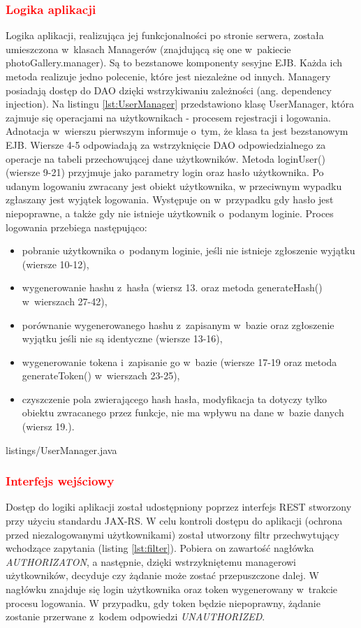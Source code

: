 \subsubsection{\textcolor{red}{Logika aplikacji}}
Logika aplikacji, realizująca jej funkcjonalności po stronie serwera, została umieszczona w~klasach Managerów (znajdującą się one w~pakiecie photoGallery.manager). Są to bezstanowe komponenty sesyjne EJB. Każda ich metoda realizuje jedno polecenie, które jest niezależne od innych. Managery posiadają dostęp do DAO dzięki wstrzykiwaniu zależności (ang. dependency injection). Na listingu
\ref{lst:UserManager} przedstawiono klasę UserManager, która zajmuje się
operacjami na użytkownikach - procesem rejestracji i logowania. Adnotacja w~wierszu pierwszym informuje o~tym, że klasa ta
jest bezstanowym EJB. Wiersze 4-5 odpowiadają za wstrzyknięcie DAO
odpowiedzialnego za operacje na tabeli przechowującej dane użytkowników.
Metoda loginUser() (wiersze 9-21) przyjmuje jako parametry login oraz
hasło użytkownika. Po udanym logowaniu zwracany jest obiekt użytkownika, w
przeciwnym wypadku zgłaszany jest wyjątek logowania. Występuje on w~przypadku
gdy hasło jest niepoprawne, a także gdy nie istnieje użytkownik o~podanym loginie. Proces logowania przebiega następująco:
\begin{itemize}
	\item pobranie użytkownika o~podanym loginie, jeśli nie istnieje zgłoszenie wyjątku (wiersze 10-12),
        \item wygenerowanie hashu z~hasła (wiersz 13. oraz metoda generateHash() w~wierszach 27-42),
	\item porównanie wygenerowanego hashu z~zapisanym w~bazie oraz zgłoszenie wyjątku jeśli nie są identyczne (wiersze 13-16),
	\item wygenerowanie tokena i~zapisanie go w~bazie (wiersze 17-19 oraz metoda generateToken() w~wierszach 23-25),
	\item czyszczenie pola zwierającego hash hasła, modyfikacja ta dotyczy tylko obiektu zwracanego przez funkcje, nie ma wpływu na dane w~bazie danych (wiersz 19.).
\end{itemize}


{listings/UserManager.java}

\subsubsection{\textcolor{red}{Interfejs wejściowy}}
Dostęp do logiki aplikacji został udostępniony poprzez interfejs REST stworzony
przy użyciu standardu JAX-RS. W celu kontroli dostępu do aplikacji
(ochrona przed niezalogowanymi użytkownikami) został utworzony filtr przechwytujący wchodzące zapytania (listing \ref{lst:filter}). 
Pobiera on zawartość nagłówka \textit{AUTHORIZATON}, a następnie, dzięki wstrzykniętemu managerowi użytkowników, decyduje czy żądanie może zostać przepuszczone dalej. W nagłówku znajduje się login użytkownika oraz token wygenerowany w~trakcie procesu logowania. W przypadku, gdy token będzie niepoprawny, żądanie zostanie przerwane z~kodem odpowiedzi \textit{UNAUTHORIZED}.


